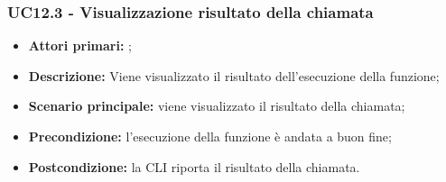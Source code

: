 \subsubsection{UC12.3 - Visualizzazione risultato della chiamata}
\begin{itemize}
	\item \textbf{Attori primari:} \ua{};
	\item \textbf{Descrizione:} Viene visualizzato il risultato dell'esecuzione della funzione; 
	\item \textbf{Scenario principale:} viene visualizzato il risultato della chiamata;
	\item \textbf{Precondizione:} l’esecuzione della funzione è andata a buon fine; 
	\item \textbf{Postcondizione:} la CLI riporta il risultato della chiamata.  
\end{itemize}